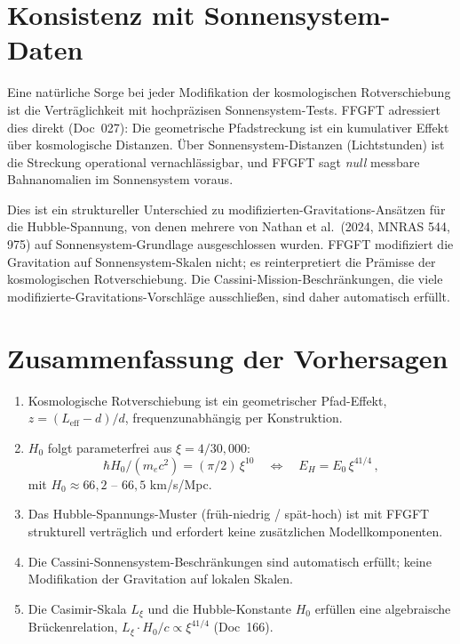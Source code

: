 \documentclass[11pt,a4paper]{article}
\begin{document}
\section{Konsistenz mit Sonnensystem-Daten}

Eine natürliche Sorge bei jeder Modifikation der kosmologischen Rotverschiebung ist die Verträglichkeit mit hochpräzisen Sonnensystem-Tests. FFGFT adressiert dies direkt (Doc~027): Die geometrische Pfadstreckung ist ein kumulativer Effekt über kosmologische Distanzen. Über Sonnensystem-Distanzen (Lichtstunden) ist die Streckung operational vernachlässigbar, und FFGFT sagt \emph{null} messbare Bahnanomalien im Sonnensystem voraus.

Dies ist ein struktureller Unterschied zu modifizierten-Gravitations-Ansätzen für die Hubble-Spannung, von denen mehrere von Nathan et al.~(2024, MNRAS 544, 975) auf Sonnensystem-Grundlage ausgeschlossen wurden. FFGFT modifiziert die Gravitation auf Sonnensystem-Skalen nicht; es reinterpretiert die Prämisse der kosmologischen Rotverschiebung. Die Cassini-Mission-Beschränkungen, die viele modifizierte-Gravitations-Vorschläge ausschließen, sind daher automatisch erfüllt.

\section{Zusammenfassung der Vorhersagen}

\begin{enumerate}\itemsep2pt
\item Kosmologische Rotverschiebung ist ein geometrischer Pfad-Effekt, $z = (L_{\mathrm{eff}}-d)/d$, frequenzunabhängig per Konstruktion.
\item $H_0$ folgt parameterfrei aus $\xi = 4/30{,}000$:
\[
\hbar H_0 / (m_e c^2) = (\pi/2)\,\xi^{10} \quad\Longleftrightarrow\quad E_H = E_0\,\xi^{41/4}\,,
\]
mit $H_0 \approx 66{,}2$ -- $66{,}5$ km/s/Mpc.
\item Das Hubble-Spannungs-Muster (früh-niedrig / spät-hoch) ist mit FFGFT strukturell verträglich und erfordert keine zusätzlichen Modellkomponenten.
\item Die Cassini-Sonnensystem-Beschränkungen sind automatisch erfüllt; keine Modifikation der Gravitation auf lokalen Skalen.
\item Die Casimir-Skala $L_\xi$ und die Hubble-Konstante $H_0$ erfüllen eine algebraische Brückenrelation, $L_\xi \cdot H_0/c \propto \xi^{41/4}$ (Doc~166).
\end{enumerate}
\end{document}
